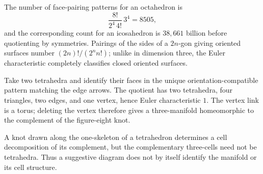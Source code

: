\begin{remark}
\label{thurston-ch01-polyhedral-counts}

The number of face-pairing patterns for an octahedron is
\[
\frac{8!}{2^4\,4!}\,3^4=8505,
\]
and the corresponding count for an icosahedron is $38{,}661$ billion before quotienting by symmetries.  Pairings of the sides of a $2n$-gon giving oriented surfaces number $(2n)!/(2^n n!)$; unlike in dimension three, the Euler characteristic completely classifies closed oriented surfaces.
\end{remark}

\begin{example}
\label{thurston-ch01-figure-eight-tetrahedra}

Take two tetrahedra and identify their faces in the unique orientation-compatible pattern matching the edge arrows.  The quotient has two tetrahedra, four triangles, two edges, and one vertex, hence Euler characteristic $1$.  The vertex link is a torus; deleting the vertex therefore gives a three-manifold homeomorphic to the complement of the figure-eight knot.
\end{example}

\begin{remark}
\label{thurston-ch01-cell-decomposition-warning}

A knot drawn along the one-skeleton of a tetrahedron determines a cell decomposition of its complement, but the complementary three-cells need not be tetrahedra.  Thus a suggestive diagram does not by itself identify the manifold or its cell structure.
\end{remark}
